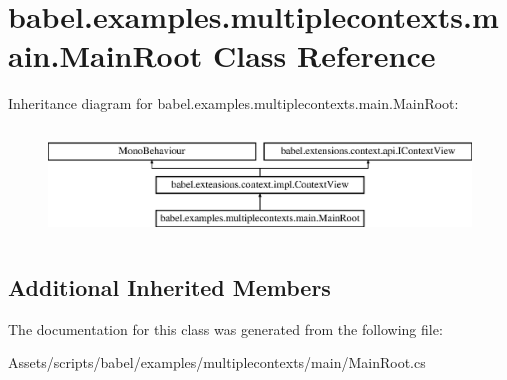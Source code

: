\hypertarget{classbabel_1_1examples_1_1multiplecontexts_1_1main_1_1_main_root}{\section{babel.\-examples.\-multiplecontexts.\-main.\-Main\-Root Class Reference}
\label{classbabel_1_1examples_1_1multiplecontexts_1_1main_1_1_main_root}
}
Inheritance diagram for babel.\-examples.\-multiplecontexts.\-main.\-Main\-Root\-:\begin{figure}[H]
\begin{center}
\leavevmode
\includegraphics[height=2.937063cm]{classbabel_1_1examples_1_1multiplecontexts_1_1main_1_1_main_root}
\end{center}
\end{figure}
\subsection*{Additional Inherited Members}


The documentation for this class was generated from the following file\-:\begin{DoxyCompactItemize}
\item 
Assets/scripts/babel/examples/multiplecontexts/main/Main\-Root.\-cs\end{DoxyCompactItemize}
